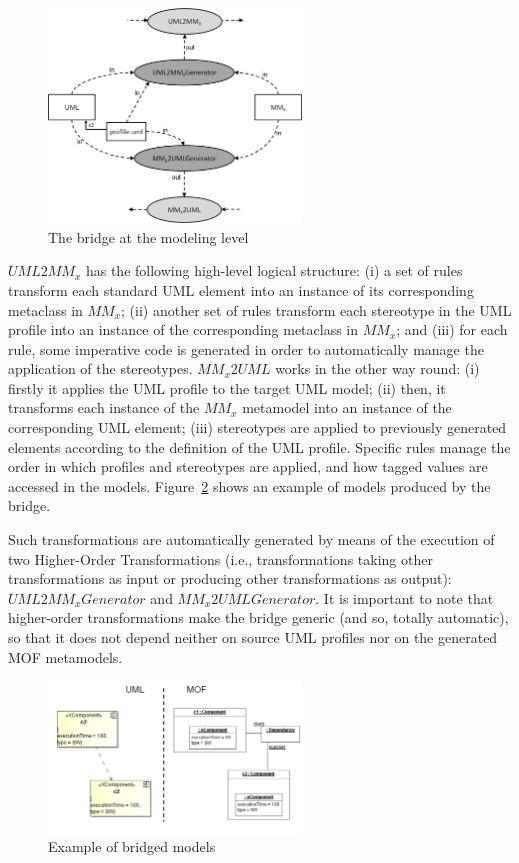 \begin{figure}[htbp]
	\centering
	\includegraphics[width=0.60\textwidth]{figures/modelingLevel.png}
	\caption{The bridge at the modeling level}
	\label{fig:modelingLevel}
\end{figure}

$UML2MM_x$ has the following high-level logical structure: (i) a set of rules transform each standard UML element into an instance of its corresponding metaclass in $MM_x$; (ii) another set of rules transform each stereotype in the UML profile into an instance of the corresponding metaclass in $MM_x$; and (iii) for each rule, some imperative code is generated in order to automatically manage the application of the stereotypes. $MM_x2UML$ works in the other way round: (i) firstly it applies the UML profile to the target UML model; (ii) then, it transforms each instance of the $MM_x$ metamodel into an instance of the corresponding UML element; (iii) stereotypes are applied to  previously generated elements according to the definition of the UML profile. Specific rules manage the order in which profiles and stereotypes are applied, and how tagged values are accessed in the models. Figure~\ref{fig:modelingExample} shows an example of models produced by the bridge.

Such transformations are automatically generated by means of the execution of two Higher-Order Transformations
(i.e., transformations taking other transformations as input or producing
other transformations as output): $UML2MM_xGenerator$ and $MM_x2UMLGenerator$. It is important to note that higher-order transformations make the bridge generic (and so, totally automatic), so that it does not depend neither on source UML profiles nor on the generated MOF metamodels.

\begin{figure}[htbp]
	\centering
		\includegraphics[width=0.60\textwidth]{figures/modelingExample.png}
	\caption{Example of bridged models}
	\label{fig:modelingExample}
\end{figure}
%

